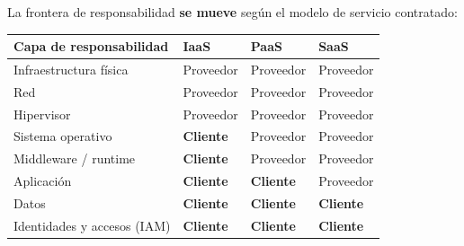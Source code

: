\documentclass[12pt,a4paper]{article}
\renewcommand{\arraystretch}{1.25}
\begin{document}
La frontera de responsabilidad \textbf{se mueve} seg\'un el modelo de servicio contratado:

\begin{center}
\small
\renewcommand{\arraystretch}{1.4}
\begin{tabularx}{\linewidth}{|>{\raggedright\arraybackslash}p{3.2cm}|>{\centering\arraybackslash}X|>{\centering\arraybackslash}X|>{\centering\arraybackslash}X|}
\hline
\rowcolor{azulUCA!20}
\textbf{Capa de responsabilidad} & \textbf{IaaS} & \textbf{PaaS} & \textbf{SaaS} \\
\hline
Infraestructura f\'isica & \cellcolor{respProv} Proveedor & \cellcolor{respProv} Proveedor & \cellcolor{respProv} Proveedor \\
\hline
Red & \cellcolor{respProv} Proveedor & \cellcolor{respProv} Proveedor & \cellcolor{respProv} Proveedor \\
\hline
Hipervisor & \cellcolor{respProv} Proveedor & \cellcolor{respProv} Proveedor & \cellcolor{respProv} Proveedor \\
\hline
Sistema operativo & \cellcolor{respCli} \textbf{Cliente} & \cellcolor{respProv} Proveedor & \cellcolor{respProv} Proveedor \\
\hline
Middleware / runtime & \cellcolor{respCli} \textbf{Cliente} & \cellcolor{respProv} Proveedor & \cellcolor{respProv} Proveedor \\
\hline
Aplicaci\'on & \cellcolor{respCli} \textbf{Cliente} & \cellcolor{respCli} \textbf{Cliente} & \cellcolor{respProv} Proveedor \\
\hline
Datos & \cellcolor{respCli} \textbf{Cliente} & \cellcolor{respCli} \textbf{Cliente} & \cellcolor{respCli} \textbf{Cliente} \\
\hline
Identidades y accesos (IAM) & \cellcolor{respCli} \textbf{Cliente} & \cellcolor{respCli} \textbf{Cliente} & \cellcolor{respCli} \textbf{Cliente} \\
\hline
\end{tabularx}
\end{center}

\begin{center}
\small
{}
\qquad
{}
\end{center}
\end{document}
